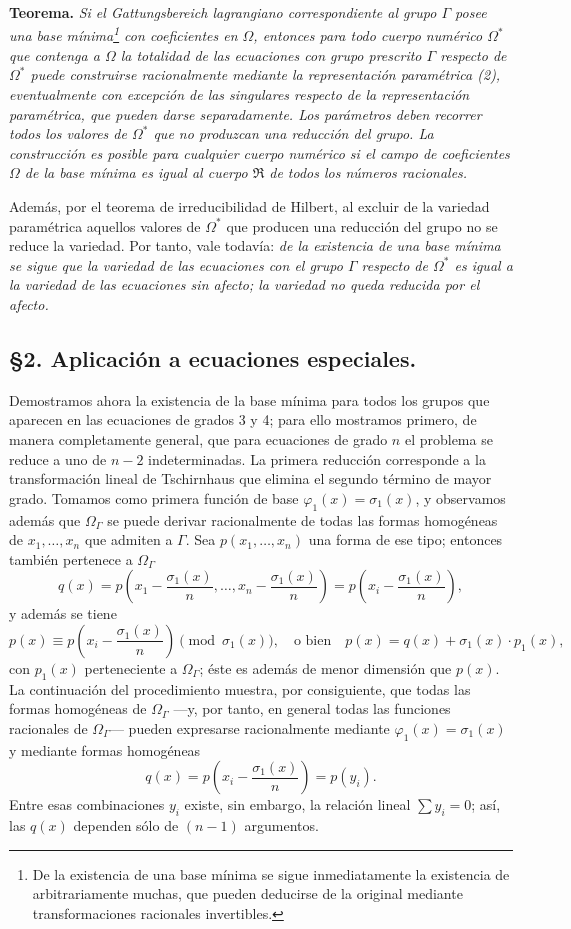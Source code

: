 \documentclass[11pt]{article}
\begin{document}
\smallskip
\noindent\textbf{Teorema.} \emph{Si el \emph{Gattungsbereich} lagrangiano correspondiente al grupo $\Gamma$ posee una base mínima\footnote{De la existencia de una base mínima se sigue inmediatamente la existencia de arbitrariamente muchas, que pueden deducirse de la original mediante transformaciones racionales invertibles.} con coeficientes en $\Omega$, entonces para todo cuerpo numérico $\Omega^*$ que contenga a $\Omega$ la totalidad de las ecuaciones con grupo prescrito $\Gamma$ respecto de $\Omega^*$ puede construirse racionalmente mediante la representación paramétrica (2), eventualmente con excepción de las singulares respecto de la representación paramétrica, que pueden darse separadamente. Los parámetros deben recorrer todos los valores de $\Omega^*$ que no produzcan una reducción del grupo. La construcción es posible para cualquier cuerpo numérico si el campo de coeficientes $\Omega$ de la base mínima es igual al cuerpo $\mathfrak R$ de todos los números racionales.}

Además, por el teorema de irreducibilidad de Hilbert, al excluir de la variedad paramétrica aquellos valores de $\Omega^*$ que producen una reducción del grupo no se reduce la variedad. Por tanto, vale todavía: \emph{de la existencia de una base mínima se sigue que la variedad de las ecuaciones con el grupo $\Gamma$ respecto de $\Omega^*$ es igual a la variedad de las ecuaciones sin afecto; la variedad no queda reducida por el afecto.}

\subsection*{\S 2. Aplicación a ecuaciones especiales.}

Demostramos ahora la existencia de la base mínima para todos los grupos que aparecen en las ecuaciones de grados 3 y 4; para ello mostramos primero, de manera completamente general, que para ecuaciones de grado $n$ el problema se reduce a uno de $n-2$ indeterminadas. La primera reducción corresponde a la transformación lineal de Tschirnhaus que elimina el segundo término de mayor grado. Tomamos como primera función de base $\varphi_1(x)=\sigma_1(x)$, y observamos además que $\Omega_\Gamma$ se puede derivar racionalmente de todas las formas homogéneas de $x_1,
\ldots,x_n$ que admiten a $\Gamma$. Sea $p(x_1,
\ldots,x_n)$ una forma de ese tipo; entonces también pertenece a $\Omega_\Gamma$
\[
q(x)=p\left(x_1-\frac{\sigma_1(x)}{n},\ldots,x_n-\frac{\sigma_1(x)}{n}\right)=p\left(x_i-\frac{\sigma_1(x)}{n}\right),
\]
y además se tiene
\[
p(x)\equiv p\left(x_i-\frac{\sigma_1(x)}{n}\right)\pmod{\sigma_1(x)},
\quad\text{o bien}\quad
p(x)=q(x)+\sigma_1(x)\cdot p_1(x),
\]
con $p_1(x)$ perteneciente a $\Omega_\Gamma$; éste es además de menor dimensión que $p(x)$. La continuación del procedimiento muestra, por consiguiente, que todas las formas homogéneas de $\Omega_\Gamma$ ---y, por tanto, en general todas las funciones racionales de $\Omega_\Gamma$--- pueden expresarse racionalmente mediante $\varphi_1(x)=\sigma_1(x)$ y mediante formas homogéneas
\[
q(x)=p\left(x_i-\frac{\sigma_1(x)}{n}\right)=p(y_i).
\]
Entre esas combinaciones $y_i$ existe, sin embargo, la relación lineal $\sum y_i=0$; así, las $q(x)$ dependen sólo de $(n-1)$ argumentos.
\end{document}

